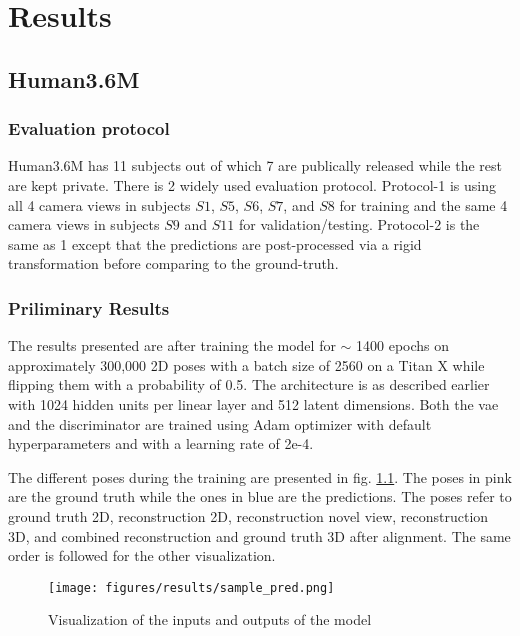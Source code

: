 \chapter{Results} %
\label{chap:results}
\section{Human3.6M}
\subsection{Evaluation protocol}
Human3.6M has 11 subjects out of which 7 are publically released while the rest are kept private. There is 2 widely used evaluation protocol. Protocol-1 is using all 4 camera views in subjects $S1$, $S5$, $S6$, $S7$, and $S8$ for training and the same 4 camera views in subjects $S9$ and $S11$ for validation/testing. Protocol-2 is the same as 1 except that the predictions are post-processed via a rigid transformation
before comparing to the ground-truth.


\subsection{Priliminary Results}

The results presented are after training the model for $\sim$ 1400 epochs on approximately 300,000 2D poses with a batch size of 2560 on a Titan X while flipping them with a probability of 0.5. The architecture is as described earlier with 1024 hidden units per linear layer and 512 latent dimensions. Both the \ac{vae} and the discriminator are trained using Adam optimizer with default hyperparameters and with a learning rate of 2e-4. 

The different poses during the training are presented in fig. \ref{fig:sample_pred}. The poses in pink are the ground truth while the ones in blue are the predictions. The poses refer to ground truth 2D, reconstruction 2D, reconstruction novel view, reconstruction 3D, and combined reconstruction and ground truth 3D after alignment. The same order is followed for the other visualization. 

\begin{figure}[h]
    \centering
    \texttt{[image: figures/results/sample\_pred.png]}
    \caption{Visualization of the inputs and outputs of the model}
    \label{fig:sample_pred}
\end{figure}

